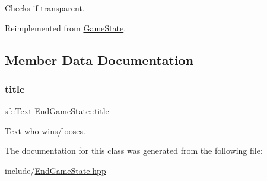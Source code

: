 Checks if transparent. 



Reimplemented from \mbox{\hyperlink{class_game_state_af75d6db30190901ed70704d18804fac7}{Game\+State}}.



\subsection{Member Data Documentation}
\mbox{\label{class_end_game_state_a987fea680922932c1ae2de74d859649d}} 
\subsubsection{\texorpdfstring{title}{title}}
{\footnotesize\ttfamily sf\+::\+Text End\+Game\+State\+::title\hspace{0.3cm}{\ttfamily [private]}}



Text who wins/looses. 



The documentation for this class was generated from the following file\+:\begin{DoxyCompactItemize}
\item 
include/\mbox{\hyperlink{_end_game_state_8hpp}{End\+Game\+State.\+hpp}}\end{DoxyCompactItemize}
